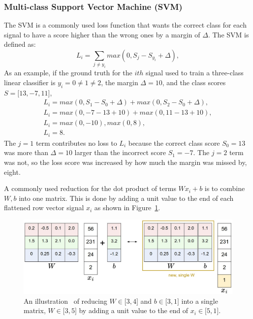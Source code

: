 \subsubsection{Multi-class Support Vector Machine (SVM)}
The SVM is a commonly used loss function that wants the correct class for each signal to have a score higher than the wrong ones by a margin of $\Delta$. The SVM is defined as:
\begin{equation}
\label{eq:svm}
L_i = \sum_{j\neq y_i}max(0,S_j-S_{y_i}+\Delta),
\end{equation}
As an example, if the ground truth for the $ith$ signal used to train a three-class linear classifier is $y_i = 0 \neq 1 \neq 2$, the margin $\Delta = 10$, and the class scores $S = \lbrack 13, -7, 11 \rbrack$, 
\begin{subequations}
\label{eq:svmexample}
\begin{align}
L_i = max(0, S_1 - S_0 + \Delta) + max(0, S_2 - S_0 + \Delta),
\\
L_i = max(0, -7 - 13 + 10) + max(0, 11 - 13 + 10),
\\
L_i = max(0, -10), max(0, 8),
\\
L_i = 8.
\end{align}
\end{subequations}
The $j=1$ term contributes no loss to $L_i$ because the correct class score $S_0 = 13$ was more than $\Delta = 10$ larger than the incorrect score $S_1 = -7$. The $j=2$ term was not, so the loss score was increased by how much the margin was missed by, eight.

A commonly used reduction for the dot product of terms $Wx_i+b$ is to combine $W, b$ into one matrix. This is done by adding a unit value to the end of each flattened row vector signal $x_i$ as shown in Figure~\ref{fig:wb}.

\begin{figure}[ht!]
	\centering	\includegraphics[width=1\textwidth,keepaspectratio]{figs/wb.jpeg}
\caption{An illustration~\cite{cs231} of reducing $W \in \lbrack 3,4 \rbrack$ and $b \in \lbrack 3,1 \rbrack$ into a single matrix, $W \in \lbrack 3,5 \rbrack$ by adding a unit value to the end of $x_i \in \lbrack 5,1 \rbrack$.} 
\label{fig:wb}      
\end{figure}

